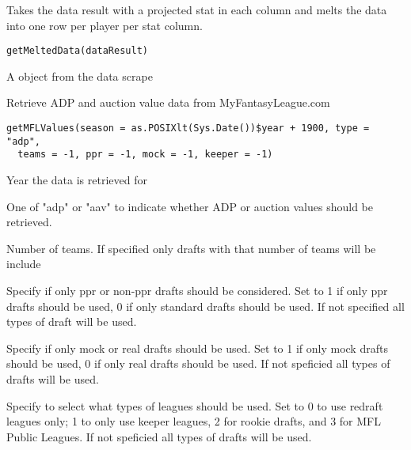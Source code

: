 \documentclass[a4paper]{book}
\begin{document}
%
\begin{Description}\relax
Takes the data result with a projected stat in each column and melts the
data into one row per player per stat column.
\end{Description}
%
\begin{Usage}
\begin{verbatim}
getMeltedData(dataResult)
\end{verbatim}
\end{Usage}
%
\begin{Arguments}
\begin{ldescription}
\item[\code{dataResult}] A  object from the data scrape
\end{ldescription}
\end{Arguments}
%
\begin{Description}\relax
Retrieve ADP and auction value data from MyFantasyLeague.com
\end{Description}
%
\begin{Usage}
\begin{verbatim}
getMFLValues(season = as.POSIXlt(Sys.Date())$year + 1900, type = "adp",
  teams = -1, ppr = -1, mock = -1, keeper = -1)
\end{verbatim}
\end{Usage}
%
\begin{Arguments}
\begin{ldescription}
\item[\code{season}] Year the data is retrieved for

\item[\code{type}] One of "adp" or "aav" to indicate whether ADP or auction values
should be retrieved.

\item[\code{teams}] Number of teams. If specified only drafts with that number of
teams will be include

\item[\code{ppr}] Specify if only ppr or non-ppr drafts should be considered. Set to 1
if only ppr drafts should be used, 0 if only standard drafts should be used.
If not specified all types of draft will be used.

\item[\code{mock}] Specify if only mock or real drafts should be used. Set to 1 if
only mock drafts should be used, 0 if only real drafts should be used. If not
speficied all types of drafts will be used.

\item[\code{keeper}] Specify to select what types of leagues should be used. Set to 0
to use redraft leagues only; 1 to only use keeper leagues, 2 for rookie drafts,
and 3 for MFL Public Leagues. If not  speficied all types of drafts will be used.
\end{ldescription}
\end{Arguments}
\end{document}
